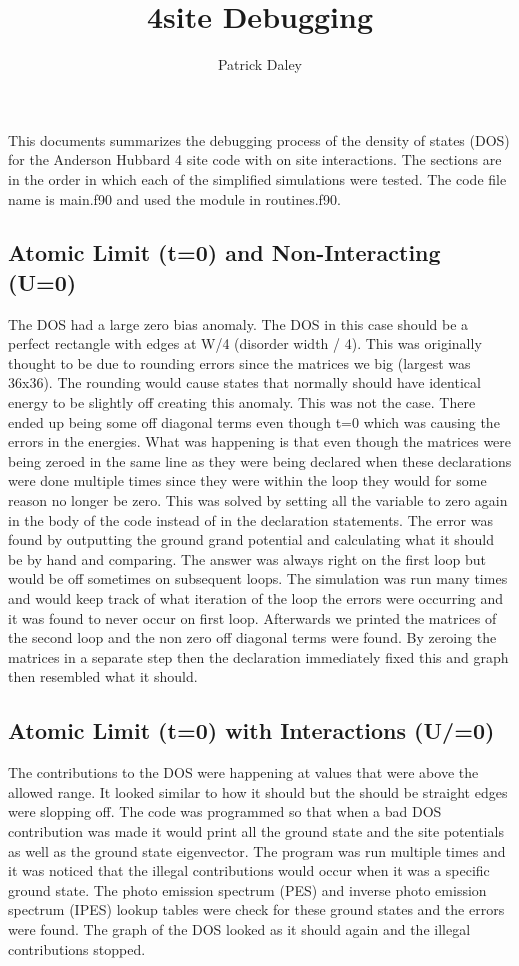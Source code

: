 \documentclass{article}
\title{4site Debugging}
\author{Patrick Daley}
\begin{document}
	
\maketitle
	
This documents summarizes the debugging process of the density of states (DOS) for the Anderson Hubbard 4 site code with on site interactions. The sections are in the order in which each of the simplified simulations were tested. The code file name is main.f90 and used the module in routines.f90.

\subsection*{Atomic Limit (t=0) and Non-Interacting (U=0)}

The DOS had a large zero bias anomaly. The DOS in this case should be a perfect rectangle with edges at W/4 (disorder width / 4). This was originally thought to be due to rounding errors since the matrices we big (largest was 36x36). The rounding would cause states that normally should have identical energy to be slightly off creating this anomaly. This was not the case. There ended up being some off diagonal terms even though t=0 which was causing the errors in the energies. What was happening is that even though the matrices were being zeroed in the same line as they were being declared when these declarations were done multiple times since they were within the loop they would for some reason no longer be zero. This was solved by setting all the variable to zero again in the body of the code instead of in the declaration statements. The error was found by outputting the ground grand potential and calculating what it should be by hand and comparing. The answer was always right on the first loop but would be off sometimes on subsequent loops. The simulation was run many times and would keep track of what iteration of the loop the errors were occurring and it was found to never occur on first loop. Afterwards we printed the matrices of the second loop and the non zero off diagonal terms were found. By zeroing the matrices in a separate step then the declaration immediately fixed this and graph then resembled what it should.

\subsection*{Atomic Limit (t=0) with Interactions (U/=0)}

The contributions to the DOS were happening at values that were above the allowed range. It looked similar to how it should but the should be straight edges were slopping off. The code was programmed so that when a bad DOS contribution was made it would print all the ground state and the site potentials as well as the ground state eigenvector. The program was run multiple times and it was noticed that the illegal contributions would occur when it was a specific ground state. The photo emission spectrum (PES) and inverse photo emission spectrum (IPES) lookup tables were check for these ground states and the errors were found. The graph of the DOS looked as it should again and the illegal contributions stopped. 
\end{document}
